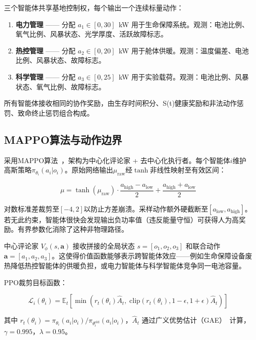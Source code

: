 \documentclass[11pt,a4paper]{ctexart}
\begin{document}
三个智能体共享基地控制权，每个输出一个连续标量动作：

\begin{enumerate}[label=\textbf{智能体\arabic*：}]
  \item \textbf{电力管理} —— 分配 $a_1 \in [0, 30]$~kW 用于生命保障系统。观测：电池比例、氧气比例、风暴状态、光学厚度、活跃故障标志。
  \item \textbf{热控管理} —— 分配 $a_2 \in [0, 20]$~kW 用于舱体供暖。观测：温度偏差、电池比例、风暴状态、故障标志。
  \item \textbf{科学管理} —— 分配 $a_3 \in [0, 25]$~kW 用于实验载荷。观测：电池比例、风暴状态、氧气比例、故障标志。
\end{enumerate}

所有智能体接收相同的协作奖励，由生存时间积分、S(t)健康奖励和非法动作惩罚、致命终止惩罚组合构成。

\subsection{MAPPO算法与动作边界}

采用MAPPO算法~\cite{mappo}，架构为中心化评论家 + 去中心化执行者。每个智能体$i$维护高斯策略$\pi_{\theta_i}(a_i | o_i)$。原始网络输出$\mu_{\text{raw}}$经$\tanh$非线性映射至有效区间：

\begin{equation}\label{eq:tanh}
  \mu = \tanh(\mu_{\text{raw}}) \cdot \frac{a_{\text{high}} - a_{\text{low}}}{2} + \frac{a_{\text{high}} + a_{\text{low}}}{2}
\end{equation}

对数标准差裁剪至$[-4, 2]$以防止方差崩溃。采样动作额外硬截断至$[a_{\text{low}}, a_{\text{high}}]$。若无此约束，智能体很快会发现输出负功率值（违反能量守恒）可获得人为高奖励。有界参数化消除了这种非物理路径。

中心评论家 $V_\phi(s, \mathbf{a})$ 接收拼接的全局状态 $s = [o_1, o_2, o_3]$ 和联合动作 $\mathbf{a} = [a_1, a_2, a_3]$。这使得价值函数能够表示跨智能体效应——例如生命保障设备废热降低热控智能体的供暖负担，或电力智能体与科学智能体竞争同一电池容量。

PPO裁剪目标函数：

\begin{equation}\label{eq:ppo}
  \mathcal{L}_i(\theta_i) = \mathbb{E}_t\left[\min\left(r_t(\theta_i)\hat{A}_t,\; \text{clip}(r_t(\theta_i), 1-\epsilon, 1+\epsilon)\hat{A}_t\right)\right]
\end{equation}

其中 $r_t(\theta_i) = \pi_{\theta_i}(a_i|o_i) / \pi_{\theta_i^{\text{old}}}(a_i|o_i)$，$\hat{A}_t$ 通过广义优势估计（GAE）~\cite{gae}计算，$\gamma = 0.995$，$\lambda = 0.95$。
\end{document}
